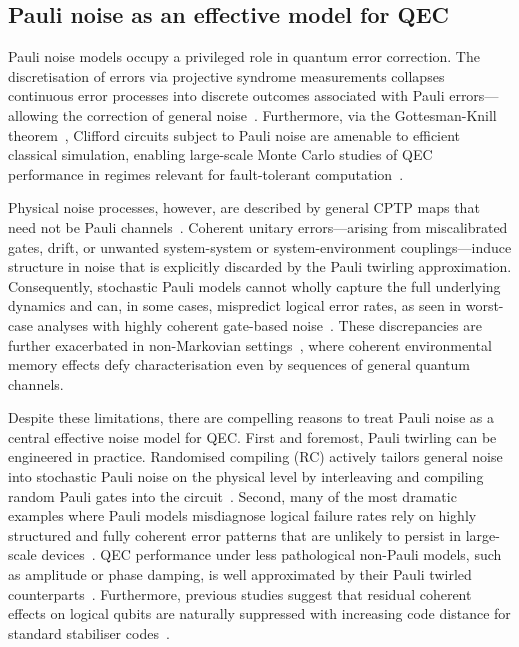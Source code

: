 \subsection{Pauli noise as an effective model for QEC}
Pauli noise models occupy a privileged role in quantum error correction. The discretisation of errors via projective syndrome measurements collapses continuous error processes into discrete outcomes associated with Pauli errors---allowing the correction of general noise~\cite{knillTheoryQuantumErrorcorrecting1997,gottesmanStabilizerCodesQuantum1997}. Furthermore, via the Gottesman-Knill theorem~\cite{gottesmanHeisenbergRepresentationQuantum1998}, Clifford circuits subject to Pauli noise are amenable to efficient classical simulation, enabling large-scale Monte Carlo studies of QEC performance in regimes relevant for fault-tolerant computation~\cite{aaronsonImprovedSimulationStabilizer2004,gidneyStimFastStabilizer2021}.

Physical noise processes, however, are described by general CPTP maps that need not be Pauli channels~\cite{nielsenQuantumComputationQuantum2010}. Coherent unitary errors---arising from miscalibrated gates, drift, or unwanted system-system or system-environment couplings---induce structure in noise that is explicitly discarded by the Pauli twirling approximation. Consequently, stochastic Pauli models cannot wholly capture the full underlying dynamics and can, in some cases, mispredict logical error rates, as seen in worst-case analyses with highly coherent gate-based noise~\cite{greenbaumModelingCoherentErrors2017,huangPerformanceQuantumError2019}. These discrepancies are further exacerbated in non-Markovian settings~\cite{kobayashiTensornetworkDecodersProcess2024}, where coherent environmental memory effects defy characterisation even by sequences of general quantum channels.

Despite these limitations, there are compelling reasons to treat Pauli noise as a central effective noise model for QEC. First and foremost, Pauli twirling can be engineered in practice. Randomised compiling (RC) actively tailors general noise into stochastic Pauli noise on the physical level by interleaving and compiling random Pauli gates into the circuit~\cite{wallmanNoiseTailoringScalable2016,bealeRandomizedCompilingFaulttolerant2023,jainImprovedQuantumError2023}. Second, many of the most dramatic examples where Pauli models misdiagnose logical failure rates rely on highly structured and fully coherent error patterns that are unlikely to persist in large-scale devices~\cite{greenbaumModelingCoherentErrors2017}. QEC performance under less pathological non-Pauli models, such as amplitude or phase damping, is well approximated by their Pauli twirled counterparts~\cite{darmawanTensornetworkSimulationsSurface2017,myersSimulatingGeneralNoise2025}. Furthermore, previous studies suggest that residual coherent effects on logical qubits are naturally suppressed with increasing code distance for standard stabiliser codes~\cite{bealeQuantumErrorCorrection2018,iversonCoherenceLogicalQuantum2020}.

